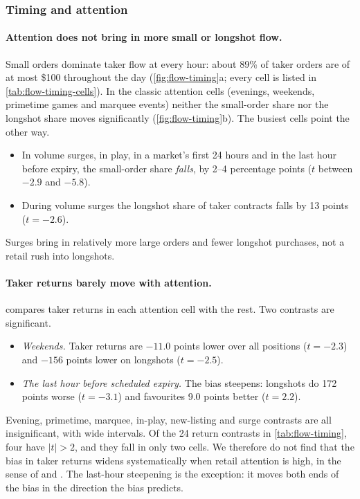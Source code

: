 \subsubsection{Timing and attention}\label{sec:res-flow-timing}

\paragraph{Attention does not bring in more small or longshot flow.} Small orders dominate taker
flow at every hour: about 89\% of taker orders are of at most \$100 throughout the day
(\cref{fig:flow-timing}a; every cell is listed in \cref{tab:flow-timing-cells}). In the classic attention cells (evenings, weekends, primetime games
and marquee events) neither the small-order share nor the longshot share moves significantly
(\cref{fig:flow-timing}b). The busiest cells point the other way.
\begin{itemize}
  \item In volume surges, in play, in a market's first 24 hours and in the last hour before
  expiry, the small-order share \emph{falls}, by 2--4 percentage points ($t$ between $-2.9$ and
  $-5.8$).
  \item During volume surges the longshot share of taker contracts falls by 13 points
  ($t=-2.6$).
\end{itemize}
Surges bring in relatively more large orders and fewer longshot purchases, not a retail rush
into longshots.

\paragraph{Taker returns barely move with attention.}  compares taker
returns in each attention cell with the rest. Two contrasts are significant.
\begin{itemize}
  \item \emph{Weekends.} Taker returns are $-11.0$ points lower over all positions ($t=-2.3$) and
  $-156$ points lower on longshots ($t=-2.5$).
  \item \emph{The last hour before scheduled expiry.} The bias steepens: longshots do 172 points
  worse ($t=-3.1$) and favourites 9.0 points better ($t=2.2$).
\end{itemize}
Evening, primetime, marquee, in-play, new-listing and surge contrasts are all insignificant, with
wide intervals. Of the 24 return contrasts in \cref{tab:flow-timing}, four have $|t|>2$, and
they fall in only two cells. We therefore do not find that the bias in taker returns widens
systematically when retail attention is high, in the sense of \citet{barberodean2008} and
\citet{barber2022}. The last-hour steepening is the exception: it moves both ends of the bias in
the direction the bias predicts.

